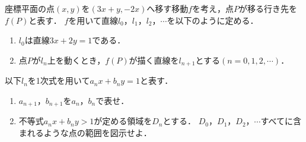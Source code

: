 \documentclass[../../main.tex]{subfiles}
\begin{document}
座標平面の点$(x,y)$を$(3x+y,-2x)$へ移す移動$f$を考え，点$P$が移る行き先を$f(P)$と表す．
$f$を用いて直線$l_0$，$l_1$，$l_2$，$\cdots$を以下のように定める．
\begin{enumerate}
  \item [・]$l_0$は直線$3x+2y=1$である．
  \item [・]点$P$が$l_n$上を動くとき，$f(P)$が描く直線を$l_{n+1}$とする$(n=0,1,2,\cdots)$．
\end{enumerate}
以下$l_n$を1次式を用いて$a_nx+b_ny=1$と表す．
\begin{enumerate}
  \item $a_{n+1}$，$b_{n+1}$を$a_n$，$b_n$で表せ．
  \item 不等式$a_nx+b_ny>1$が定める領域を$D_n$とする．
    $D_0$，$D_1$，$D_2$，$\cdots$すべてに含まれるような点の範囲を図示せよ．
\end{enumerate}
\end{document}
